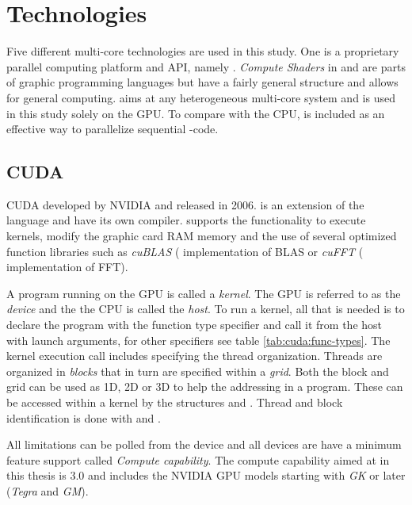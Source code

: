 \chapter{Technologies}\label{cha:technologies}

\newcommand{\procwidth}{{\textwidth * 3 / 4}}

Five different multi-core technologies are used in this study. One is a proprietary parallel computing platform and \gls{API}, namely {\CU}. \textit{Compute Shaders} in {\GL} and {\DX} are parts of graphic programming languages but have a fairly general structure and allows for general computing. {\OCL} aims at any heterogeneous multi-core system and is used in this study solely on the \gls{GPU}. To compare with the \gls{CPU}, {\OMP} is included as an effective way to parallelize sequential {\CPP}-code.

\section{CUDA}

\gls{CUDA} developed by NVIDIA and released in 2006. {\CU} is an extension of the {\CPP} language and have its own compiler. {\CU} supports the functionality to execute kernels, modify the graphic card RAM memory and the use of several optimized function libraries such as \textit{cuBLAS} ({\CU} implementation of \gls{BLAS} or \textit{cuFFT} ({\CU} implementation of \gls{FFT}).

A program running on the \gls{GPU} is called a \emph{kernel}. The \gls{GPU} is referred to as the \textit{device} and the the CPU is called the \textit{host}. To run a {\CU} kernel, all that is needed is to declare the program with the function type specifier  and call it from the host with launch arguments, for other specifiers see table \ref{tab:cuda:func-types}. The kernel execution call includes specifying the thread organization. Threads are organized in \emph{blocks} that in turn are specified within a \emph{grid}. Both the block and grid can be used as \gls{1D}, \gls{2D} or \gls{3D} to help the addressing in a program. These can be accessed within a kernel by the structures  and . Thread and block identification is done with  and .

All limitations can be polled from the device and all devices are have a minimum feature support called \emph{Compute capability}. The compute capability aimed at in this thesis is $3.0$ and includes the NVIDIA \gls{GPU} models starting with \emph{GK} or later (\emph{Tegra} and \emph{GM}).

